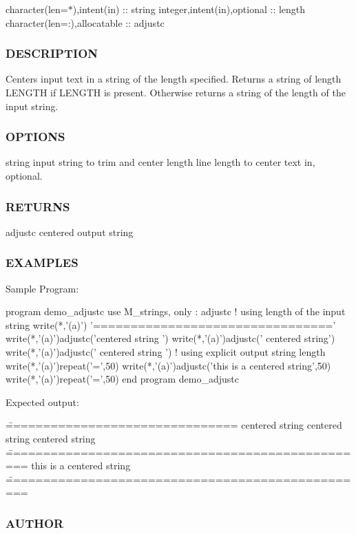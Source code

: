 character(len=$\ast$),intent(in) \+:\+: string integer,intent(in),optional \+:\+: length character(len=\+:),allocatable \+:\+: adjustc \subsubsection*{D\+E\+S\+C\+R\+I\+P\+T\+I\+ON}

Centers input text in a string of the length specified. Returns a string of length L\+E\+N\+G\+TH if L\+E\+N\+G\+TH is present. Otherwise returns a string of the length of the input string. \subsubsection*{O\+P\+T\+I\+O\+NS}

string input string to trim and center length line length to center text in, optional. \subsubsection*{R\+E\+T\+U\+R\+NS}

adjustc centered output string

\subsubsection*{E\+X\+A\+M\+P\+L\+ES}

\begin{DoxyVerb}Sample Program:

 program demo_adjustc
 use M_strings, only : adjustc
 !  using length of the input string
    write(*,'(a)')       '================================'
    write(*,'(a)')adjustc('centered string                 ')
    write(*,'(a)')adjustc('                 centered string')
    write(*,'(a)')adjustc('  centered string               ')
 !  using explicit output string length
    write(*,'(a)')repeat('=',50)
    write(*,'(a)')adjustc('this is a centered string',50)
    write(*,'(a)')repeat('=',50)
 end program demo_adjustc

Expected output:

 \================================
         centered string
         centered string
         centered string
 \==================================================
             this is a centered string
 \==================================================
\end{DoxyVerb}
 \subsubsection*{A\+U\+T\+H\+OR}

